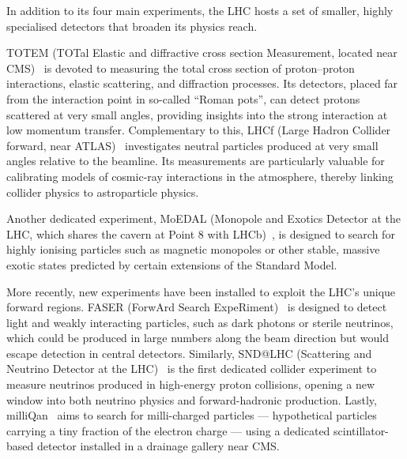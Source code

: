 \vspace{0.5 cm}

In addition to its four main experiments, the LHC hosts a set of smaller, highly specialised detectors that broaden its physics reach.

TOTEM (TOTal Elastic and diffractive cross section Measurement, located near CMS)~\cite{TOTEM:JINST} is devoted to measuring the total cross section of proton–proton interactions, elastic scattering, and diffraction processes. Its detectors, placed far from the interaction point in so-called ``Roman pots'', can detect protons scattered at very small angles, providing insights into the strong interaction at low momentum transfer. Complementary to this, LHCf (Large Hadron Collider forward, near ATLAS)~\cite{LHCf:JINST} investigates neutral particles produced at very small angles relative to the beamline. Its measurements are particularly valuable for calibrating models of cosmic-ray interactions in the atmosphere, thereby linking collider physics to astroparticle physics.

Another dedicated experiment, MoEDAL (Monopole and Exotics Detector at the LHC, which shares the cavern at Point 8 with LHCb)~\cite{MoEDAL:physics}, is designed to search for highly ionising particles such as magnetic monopoles or other stable, massive exotic states predicted by certain extensions of the Standard Model.

More recently, new experiments have been installed to exploit the LHC's unique forward regions. FASER (ForwArd Search ExpeRiment)~\cite{FASER:detector} is designed to detect light and weakly interacting particles, such as dark photons or sterile neutrinos, which could be produced in large numbers along the beam direction but would escape detection in central detectors. Similarly, SND@LHC (Scattering and Neutrino Detector at the LHC)~\cite{SNDLHC:detector} is the first dedicated collider experiment to measure neutrinos produced in high-energy proton collisions, opening a new window into both neutrino physics and forward-hadronic production. Lastly, milliQan~\cite{milliQan:demonstrator} aims to search for milli-charged particles --- hypothetical particles carrying a tiny fraction of the electron charge --- using a dedicated scintillator-based detector installed in a drainage gallery near CMS.

\vspace{0.5 cm}

